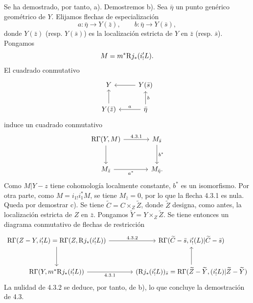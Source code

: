 Se ha demostrado, por tanto, a). Demostremos b). Sea $\bar\eta$ un punto genérico geométrico de $Y$. Elijamos flechas de especialización
\[
a:\bar\eta\to Y(\bar z),\qquad b:\bar\eta\to Y(\bar s),
\]
donde $Y(\bar z)$ (resp. $Y(\bar s)$) es la localización estricta de $Y$ en $\bar z$ (resp. $\bar s$). Pongamos
\[
M=m^*\mathrm{R} j_*(i'_!L).
\]
El cuadrado conmutativo
\[
\begin{tikzcd}
Y & Y(\bar s)\arrow[l]\\
Y(\bar z)\arrow[u] & \bar\eta \arrow[l,"a"']\arrow[u,"b"']
\end{tikzcd}
\]
induce un cuadrado conmutativo
\[
\begin{tikzcd}[column sep=large,row sep=large]
\R\Gamma(Y,M) \arrow[r,"4.3.1"] \arrow[d] & M_{\bar s} \arrow[d,"b^*"]\\
M_{\bar z} \arrow[r,"a^*"'] & M_{\bar\eta}.
\end{tikzcd}
\]
Como $M|Y-z$ tiene cohomología localmente constante, $b^*$ es un isomorfismo. Por otra parte, como $M=i_{1!}i_1^*M$, se tiene $M_{\bar z}=0$, por lo que la flecha 4.3.1 es nula. Queda por demostrar c). Se tiene $\widetilde C=C\times_Z\widetilde Z$, donde $\widetilde Z$ designa, como antes, la localización estricta de $Z$ en $\bar z$. Pongamos $\widetilde Y=Y\times_Z\widetilde Z$. Se tiene entonces un diagrama conmutativo de flechas de restricción
\[
\begin{tikzcd}[column sep=large,row sep=large]
\R\Gamma(Z-Y,i'_!L)=\R\Gamma(Z,\R j_*(i'_!L))
 \arrow[r,"4.3.2"] \arrow[d]
&
\R\Gamma(\widetilde C-\bar s,i'_!(L)|\widetilde C-\bar s)\\
\R\Gamma(Y,m^*\R j_*(i'_!L)) \arrow[r,"4.3.1"']
&
(\R j_*(i'_!L))_{\bar s}
  =\R\Gamma(\widetilde Z-\widetilde Y,(i'_!L)|\widetilde Z-\widetilde Y) \arrow[u]
\end{tikzcd}
\]
La nulidad de 4.3.2 se deduce, por tanto, de b), lo que concluye la demostración de 4.3.
